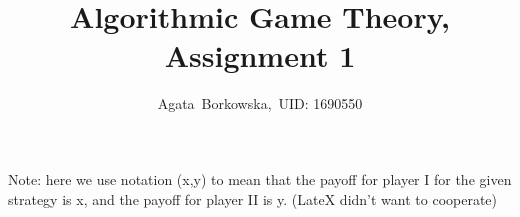 \documentclass[11pt,journal]{article}
\begin{document}
	\title{Algorithmic Game Theory, Assignment 1}
	
	\author{Agata~Borkowska,~UID: 1690550}%
	



	
	
	\maketitle
	
	
	
	
	
	
	
	\section{}
	Note: here we use notation (x,y) to mean that the payoff for player I for the given strategy is x, and the payoff for player II is y. (LateX didn't want to cooperate)
	
\end{document}
